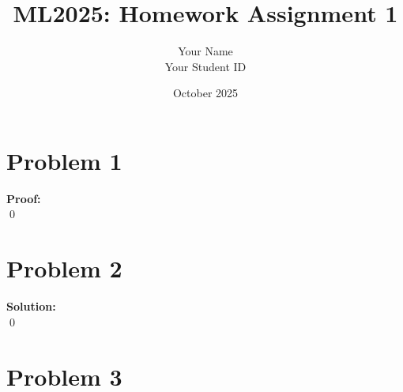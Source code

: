 \documentclass[12pt, a4paper,oneside, UTF8]{article}
\title{ML2025: Homework Assignment 1}
\author{
Your Name\\
Your Student ID
}
\date{October 2025}
\renewenvironment{proof}{\textbf{Proof:}\\}{\qed\par}
\newenvironment{solution}{\textbf{Solution:}\\}{\qed\par}
\begin{document}
\maketitle

\section{Problem 1}
\begin{proof}
    
\end{proof}



\section{Problem 2}
\begin{solution}
    
\end{solution}



\section{Problem 3}
\end{document}
